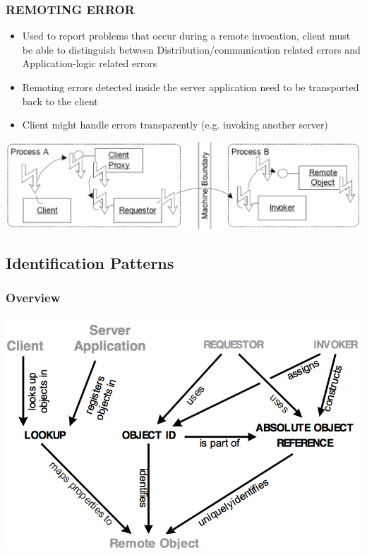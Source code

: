 \documentclass[10pt]{article}
\begin{document}
\subsubsection{REMOTING ERROR}
\begin{itemize}
	\item Used to report problems that occur during a remote invocation, client must be able to distinguish between Distribution/communication related errors and Application-logic related errors
	\item Remoting errors detected inside the server application need to be transported back to the client
	\item Client might handle errors transparently (e.g. invoking another server)
\end{itemize}
\begin{center}
	\includegraphics[scale=0.2]{remoting-error.png}
\end{center}
\subsection{Identification Patterns}
\subsubsection{Overview}
\begin{center}
	\includegraphics[scale=0.3]{identification-patterns.png}
\end{center}
\end{document}
